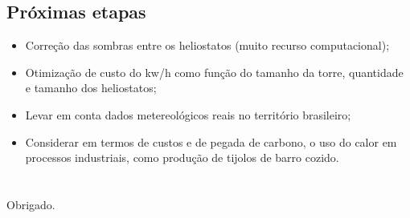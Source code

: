 \documentclass[12pt,notheorems,hyperref={pdfauthor= Rafael Nardi}]{beamer}
\begin{document}
\subsection{Próximas etapas}

\begin{frame}
	\begin{itemize}
		\item Correção das sombras entre os heliostatos (muito recurso computacional);\pause
		\item Otimização de custo do kw/h como função do tamanho da torre, quantidade e tamanho dos heliostatos;\pause
		\item Levar em conta dados metereológicos reais no território brasileiro;\pause
		\item Considerar em termos de custos e de pegada de carbono, o uso do calor
			em processos industriais, como produção de tijolos de barro cozido.
	\end{itemize}
\end{frame}

\section{}
\subsection{}

\begin{frame}%
	\centering
	{\Large Obrigado.}
\end{frame}
\end{document}
